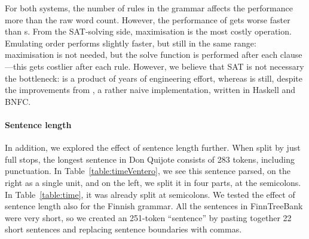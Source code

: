 For both systems, the number of rules in the grammar affects the performance 
more than the raw word count.
However, the performance of \satcg{} gets worse faster than s.
From the SAT-solving side, maximisation is the most costly operation. 
Emulating order performs slightly faster, but still in the same range: 
maximisation is not needed, but the solve function is performed after 
each clause---this gets costlier after each rule.
However, we believe that SAT is not necessary the bottleneck:
 is a product of years of engineering effort, whereas \satcg{}
is still, despite the improvements from \citet{listenmaa_claessen2015},
a rather naive implementation, written in Haskell and BNFC.


\paragraph{Sentence length} 
In addition, we explored the effect of sentence length further.
When split by just full stops, the longest sentence in Don Quijote consists of 283 tokens, %
including punctuation. In Table~\ref{table:timeVentero}, we see this sentence parsed, on the right as a single unit, and on the left, we split it in four parts, at the semicolons. In Table~\ref{table:time}, it was already split at semicolons.
We tested the effect of sentence length also for the Finnish grammar.
All the sentences in FinnTreeBank were very short, so we created an 251-token ``sentence'' 
by pasting together 22 short sentences and replacing sentence boundaries with commas.


